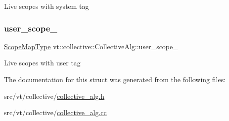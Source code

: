 Live scopes with system tag \mbox{\label{structvt_1_1collective_1_1_collective_alg_a72bb12e5bbe0c52e867c81e76db318d9}} 
\subsubsection{\texorpdfstring{user\+\_\+scope\+\_\+}{user\_scope\_}}
{\footnotesize\ttfamily \hyperlink{structvt_1_1collective_1_1_collective_alg_abf644b20fe35cf654f5d4a6702ef5183}{Scope\+Map\+Type} vt\+::collective\+::\+Collective\+Alg\+::user\+\_\+scope\+\_\+\hspace{0.3cm}{\ttfamily [private]}}

Live scopes with user tag 

The documentation for this struct was generated from the following files\+:\begin{DoxyCompactItemize}
\item 
src/vt/collective/\hyperlink{collective__alg_8h}{collective\+\_\+alg.\+h}\item 
src/vt/collective/\hyperlink{collective__alg_8cc}{collective\+\_\+alg.\+cc}\end{DoxyCompactItemize}
